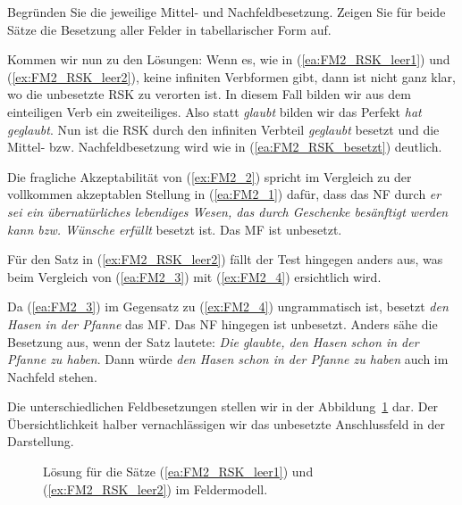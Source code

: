 Begründen Sie die jeweilige Mittel- und Nachfeldbesetzung.
Zeigen Sie für beide Sätze die Besetzung aller Felder in tabellarischer Form auf.


Kommen wir nun zu den Lösungen: Wenn es, wie in (\ref{ea:FM2_RSK_leer1}) und (\ref{ex:FM2_RSK_leer2}), keine infiniten Verbformen gibt, dann ist nicht ganz klar, wo die unbesetzte RSK zu verorten ist. In diesem Fall bilden wir aus dem einteiligen Verb ein zweiteiliges. Also statt \textit{glaubt} bilden wir \zB das Perfekt \textit{hat geglaubt}. Nun ist die RSK durch den infiniten Verbteil \textit{geglaubt} besetzt und die Mittel- bzw. Nachfeldbesetzung wird wie in (\ref{ea:FM2_RSK_besetzt}) deutlich.

\ea \label{ea:FM2_RSK_besetzt}
\label{ea:FM2_1}
\label{ex:FM2_2}
\z 
\z 

Die fragliche Akzeptabilität von (\ref{ex:FM2_2}) spricht im Vergleich zu der vollkommen akzeptablen Stellung in (\ref{ea:FM2_1}) dafür, dass das NF durch \textit{er sei ein übernatürliches lebendiges Wesen, das durch Geschenke besänftigt werden kann bzw. Wünsche erfüllt} besetzt ist. Das MF ist unbesetzt.

Für den Satz in (\ref{ex:FM2_RSK_leer2}) fällt der Test hingegen anders aus, was beim Vergleich von (\ref{ea:FM2_3}) mit (\ref{ex:FM2_4}) ersichtlich wird. 

\ea \label{ea:FM2_RSK_besetzt_2}
\label{ea:FM2_3}
\label{ex:FM2_4}
\z 
\z 

Da (\ref{ea:FM2_3}) im Gegensatz zu (\ref{ex:FM2_4}) ungrammatisch ist, besetzt \textit{den Hasen in der Pfanne} das MF. Das NF hingegen ist unbesetzt. Anders sähe die Besetzung aus, wenn der Satz lautete: \textit{Die glaubte, den Hasen schon in der Pfanne zu haben}. Dann würde \textit{den Hasen schon in der Pfanne zu haben} auch im Nachfeld stehen.

Die unterschiedlichen Feldbesetzungen stellen wir in der Abbildung~\ref{fig:FM3} dar. Der Übersichtlichkeit halber vernachlässigen wir das unbesetzte Anschlussfeld in der Darstellung.

\begin{figure}[!htbp]
  \centering
  \caption{Lösung für die Sätze (\ref{ea:FM2_RSK_leer1}) und (\ref{ex:FM2_RSK_leer2}) im Feldermodell.}
  \label{fig:FM3}
\end{figure}

